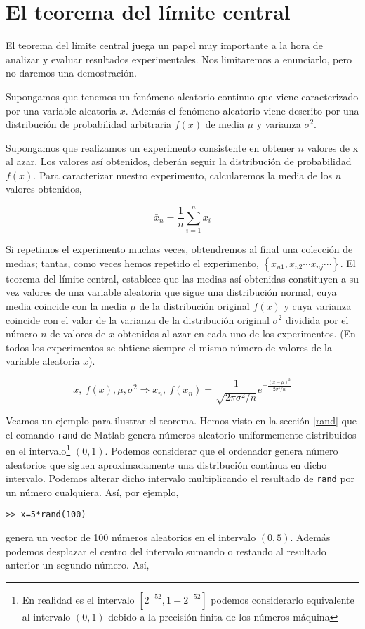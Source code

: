 \section{El teorema del límite central}\label{tlc}

El teorema del límite central juega un papel muy importante a la hora de analizar y evaluar resultados experimentales. Nos limitaremos a enunciarlo, pero no daremos una demostración.

Supongamos que tenemos un fenómeno aleatorio continuo que viene caracterizado por una variable aleatoria $x$. Además el fenómeno aleatorio viene descrito por una distribución de probabilidad arbitraria $f(x)$ de media $\mu$ y varianza $\sigma^2$.

Supongamos que realizamos un experimento consistente en obtener $n$ valores de x al azar. Los valores así obtenidos, deberán seguir la distribución de probabilidad $f(x)$. Para caracterizar nuestro experimento, calcularemos la media de los $n$ valores obtenidos,

\begin{equation*}
\bar{x}_n=\frac{1}{n}\sum_{i=1}^n x_i
\end{equation*}

Si repetimos el experimento muchas veces, obtendremos al final una colección de medias; tantas, como veces hemos repetido el experimento,
$\left\{\bar{x}_{n1}, \bar{x}_{n2} \cdots \bar{x}_{nj} \cdots \right\}$. El teorema del límite central, establece que las medias así obtenidas constituyen a su vez valores de una variable aleatoria que sigue una distribución normal, cuya media coincide con la media $\mu$ de la distribución original $f(x)$ y cuya varianza coincide con el valor de la varianza de la distribución original $\sigma^2$ dividida por el número $n$ de valores de $x$ obtenidos al azar en cada uno de los experimentos. (En todos los experimentos se obtiene siempre el mismo número de valores de la variable aleatoria $x$).

\begin{equation*}
x, \ f(x), \mu, \sigma^2 \Rightarrow \bar{x}_n,\ f(\bar{x}_n)=\frac{1}{\sqrt{2\pi\sigma^2/n}}e^{-\frac{(x-\mu)^2}{2\sigma^2/n}}  
\end{equation*}

Veamos un ejemplo para ilustrar el teorema. Hemos visto en la sección \ref{rand} que el comando \texttt{rand} de Matlab genera números aleatorio uniformemente distribuidos en el intervalo\footnote{En realidad es el intervalo $[2^{-52},1-2^{-52}]$ podemos considerarlo equivalente al intervalo $(0,1)$ debido a la precisión finita de los números máquina} $(0,1)$. Podemos considerar que el ordenador genera número aleatorios que siguen aproximadamente una distribución continua en dicho intervalo. Podemos alterar dicho intervalo multiplicando el resultado de \texttt{rand} por un número cualquiera. Así, por ejemplo,
\begin{verbatim}
>> x=5*rand(100)
\end{verbatim} 
genera un vector de 100 números aleatorios en el intervalo $(0,5)$.
Además podemos desplazar el centro del intervalo sumando o restando al resultado anterior un segundo número. Así,

